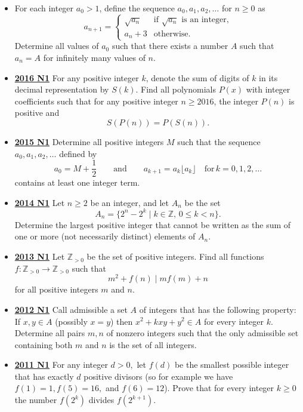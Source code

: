 \documentclass[11pt]{scrartcl}
\begin{document}
\begin{itemize}[leftmargin=*]
    \item {}  For each integer $a_0 > 1$, define the sequence $a_0, a_1, a_2, \dots$ for $n \geqslant  0$ as
$$a_{n+1} = 
\begin{cases}
\sqrt{a_n} & \text{if } \sqrt{a_n} \text{ is an integer,} \\
a_n + 3 & \text{otherwise.}
\end{cases}
$$Determine all values of $a_0$ such that there exists a number $A$ such that $a_n = A$ for infinitely many values of $n$.
    \item \href{https://artofproblemsolving.com/community/c6h1480723p8639330}{\textbf{2016 N1}}  For any positive integer $k$, denote the sum of digits of $k$ in its decimal representation by $S(k)$. Find all polynomials $P(x)$ with integer coefficients such that for any positive integer $n \geqslant  2016$, the integer $P(n)$ is positive and$$S(P(n)) = P(S(n)).$$
    \item \href{https://artofproblemsolving.com/community/c6h1268859p6622268}{\textbf{2015 N1}}	Determine all positive integers $M$ such that the sequence $a_0, a_1, a_2, \dots$ defined by\[ a_0 = M + \frac{1}{2}   \qquad  \textrm{and} \qquad    a_{k+1} = a_k\lfloor a_k \rfloor   \quad \textrm{for} \, k = 0, 1, 2, \dots \]contains at least one integer term.
    \item \href{https://artofproblemsolving.com/community/c6h1113195p5083566}{\textbf{2014 N1}} Let $n \geqslant  2$ be an integer, and let $A_n$ be the set\[A_n = \{2^n  - 2^k\mid k \in \mathbb{Z},\, 0 \leqslant k < n\}.\]Determine the largest positive integer that cannot be written as the sum of one or more (not necessarily distinct) elements of $A_n$.
    \item \href{https://artofproblemsolving.com/community/c6h597243p3544096}{\textbf{2013 N1}} Let $\mathbb{Z} _{>0}$ be the set of positive integers. Find all functions $f: \mathbb{Z} _{>0}\rightarrow \mathbb{Z} _{>0}$ such that
\[ m^2 + f(n) \mid mf(m) +n \]
for all positive integers $m$ and $n$.
    \item \href{https://artofproblemsolving.com/community/c6h546186p3160599}{\textbf{2012 N1}}  Call admissible a set $A$ of integers that has the following property:
If $x,y \in A$ (possibly $x=y$) then $x^2+kxy+y^2 \in A$ for every integer $k$.
Determine all pairs $m,n$ of nonzero integers such that the only admissible set containing both $m$ and $n$ is the set of all integers.
    \item \href{https://artofproblemsolving.com/community/c6h488539p2737648}{\textbf{2011 N1}} For any integer $d > 0,$ let $f(d)$ be the smallest possible integer that has exactly $d$ positive divisors (so for example we have $f(1)=1, f(5)=16,$ and $f(6)=12$). Prove that for every integer $k \geqslant  0$ the number $f\left(2^k\right)$ divides $f\left(2^{k+1}\right).$

\end{itemize}
\end{document}
